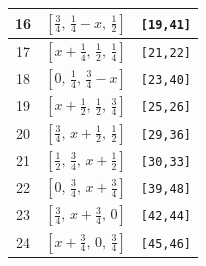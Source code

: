 \documentclass[fleqn,8pt]{jsarticle}
\begin{document}
\begin{longtable}{ccc}
16 & $\left[ \frac{3}{4},\, \frac{1}{4} - x,\, \frac{1}{2} \right]$ & {\tt [19,41]} \\ \hline
17 & $\left[ x + \frac{1}{4},\, \frac{1}{2},\, \frac{1}{4} \right]$ & {\tt [21,22]} \\ \hline
18 & $\left[ 0,\, \frac{1}{4},\, \frac{3}{4} - x \right]$ & {\tt [23,40]} \\ \hline
19 & $\left[ x + \frac{1}{2},\, \frac{1}{2},\, \frac{3}{4} \right]$ & {\tt [25,26]} \\ \hline
20 & $\left[ \frac{3}{4},\, x + \frac{1}{2},\, \frac{1}{2} \right]$ & {\tt [29,36]} \\ \hline
21 & $\left[ \frac{1}{2},\, \frac{3}{4},\, x + \frac{1}{2} \right]$ & {\tt [30,33]} \\ \hline
22 & $\left[ 0,\, \frac{3}{4},\, x + \frac{3}{4} \right]$ & {\tt [39,48]} \\ \hline
23 & $\left[ \frac{3}{4},\, x + \frac{3}{4},\, 0 \right]$ & {\tt [42,44]} \\ \hline
24 & $\left[ x + \frac{3}{4},\, 0,\, \frac{3}{4} \right]$ & {\tt [45,46]} \\
\end{longtable}
\renewcommand{\arraystretch}{1.2}
\end{document}
